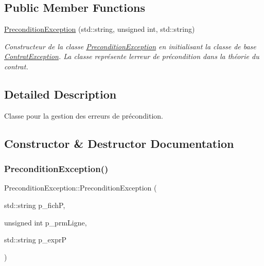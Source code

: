 \subsection*{Public Member Functions}
\begin{DoxyCompactItemize}
\item 
\hyperlink{classPreconditionException_a66d4b4c57a0675d487dab85d2c31b08c}{Precondition\+Exception} (std\+::string, unsigned int, std\+::string)
\begin{DoxyCompactList}\small\item\em Constructeur de la classe \hyperlink{classPreconditionException}{Precondition\+Exception} en initialisant la classe de base \hyperlink{classContratException}{Contrat\+Exception}. La classe représente l\textquotesingle{}erreur de précondition dans la théorie du contrat. \end{DoxyCompactList}\end{DoxyCompactItemize}


\subsection{Detailed Description}
Classe pour la gestion des erreurs de précondition. 

\subsection{Constructor \& Destructor Documentation}
\mbox{\label{classPreconditionException_a66d4b4c57a0675d487dab85d2c31b08c}} 
\subsubsection{\texorpdfstring{Precondition\+Exception()}{PreconditionException()}}
{\footnotesize\ttfamily Precondition\+Exception\+::\+Precondition\+Exception (\begin{DoxyParamCaption}\item[{std\+::string}]{p\+\_\+fichP,  }\item[{unsigned int}]{p\+\_\+prm\+Ligne,  }\item[{std\+::string}]{p\+\_\+exprP }\end{DoxyParamCaption})}



